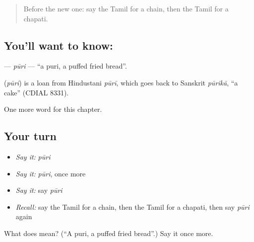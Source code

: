 \label{lesson:TA-C270-puri}



\begin{quote}
Before the new one: say the Tamil for a chain, then the Tamil for a chapati.
\end{quote}

\subsection*{You'll want to know: }
\textbf{} — \emph{pūri} — \textquotedblleft{}a puri, a puffed fried bread\textquotedblright{}.

\begin{cousinweb}
\textbf{} (\emph{pūri}) is a loan from Hindustani \emph{pūrī}, which goes back to Sanskrit \emph{pūrikā}, \textquotedblleft{}a cake\textquotedblright{} (CDIAL 8331).
\end{cousinweb}

\begin{grammarlens}[title={What you've built}]
One more word for this chapter.
\end{grammarlens}

\subsection*{Your turn}
\begin{itemize}
\raggedright
  \item \emph{Say it:} \emph{pūri}
  \item \emph{Say it:} \emph{pūri}, once more
  \item \emph{Say it:} say \emph{pūri}
  \item \emph{Recall:} say the Tamil for a chain, then the Tamil for a chapati, then say \emph{pūri} again
\end{itemize}

\begin{tcolorbox}[breakable,colback=teal!4,colframe=teal!35!black,title={Before you move on}]
What does  mean? (\textquotedblleft{}A puri, a puffed fried bread\textquotedblright{}.) Say it once more.
\end{tcolorbox}
